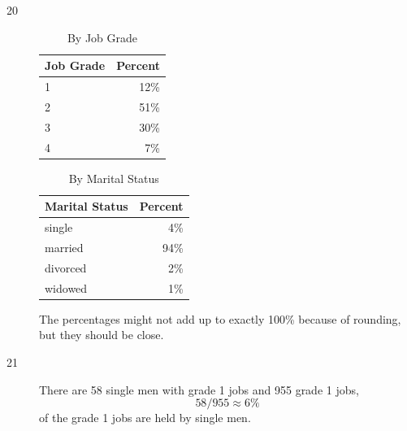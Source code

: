 \documentclass[letterpaper, landscape]{exam}
\begin{document}
\begin{description}

      \item[20]
        \begin{table}[H]
          \centering
          \begin{tabular}{lr}
            \toprule
            Job Grade & Percent \\
            \midrule
            1         & 12\% \\
            2         & 51\% \\
            3         & 30\% \\
            4         & 7\% \\
            \bottomrule
          \end{tabular}
          \caption{By Job Grade}
        \end{table}

        \begin{table}[H]
          \centering
          \begin{tabular}{lr}
            \toprule
            Marital Status & Percent \\
            \midrule
            single         & 4\% \\
            married        & 94\% \\
            divorced       & 2\% \\
            widowed        & 1\% \\
            \bottomrule
          \end{tabular}
          \caption{By Marital Status}
        \end{table}

      The percentages might not add up to exactly 100\% because of rounding, but
      they should be close.
      
    \item[21]
      There are 58 single men with grade 1 jobs and 955 grade 1 jobs, 
      \[
        58/955 \approx 6 \%
      \]
      of the grade 1 jobs are held by single men.


\end{description}
\end{document}
